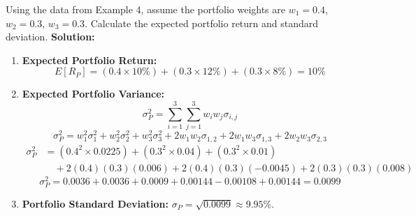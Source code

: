 \begin{tcolorbox}[
	colback=gray!5!white,
	colframe=black!15!white,
	boxrule=0.5pt,
	arc=3pt,
	title=\textbf{Example 5: Return and Risk of a Three-Asset Portfolio},
	coltitle=black,
	colbacktitle=black!5!white,
	before skip=6pt,
	after skip=6pt,
	breakable
]
Using the data from Example 4, assume the portfolio weights are $w_1 = 0.4$, $w_2 = 0.3$, $w_3 = 0.3$.
Calculate the expected portfolio return and standard deviation.
\textbf{Solution:}
\begin{enumerate}
	\item \textbf{Expected Portfolio Return:}
	      \[
	      E[R_P] = (0.4 \times 10\%) + (0.3 \times 12\%) + (0.3 \times 8\%) = 10\%
	      \]
	\item \textbf{Expected Portfolio Variance:}
	      \[
	      \sigma_P^2 = \sum_{i=1}^3 \sum_{j=1}^3 w_i w_j \sigma_{i,j}
	      \]
	      \[
	      \sigma_P^2 = w_1^2 \sigma_1^2 + w_2^2 \sigma_2^2 + w_3^2 \sigma_3^2 + 2 w_1 w_2 \sigma_{1,2} + 2 w_1 w_3 \sigma_{1,3} + 2 w_2 w_3 \sigma_{2,3}
	      \]
	      \[
	      \begin{aligned}
		      \sigma_P^2 &= (0.4^2 \times 0.0225) + (0.3^2 \times 0.04) + (0.3^2 \times 0.01) \\
		      &\quad + 2(0.4)(0.3)(0.006) + 2(0.4)(0.3)(-0.0045) + 2(0.3)(0.3)(0.008)
	      \end{aligned}
	      \]
	      \[
	      \sigma_P^2 = 0.0036 + 0.0036 + 0.0009 + 0.00144 - 0.00108 + 0.00144 = 0.0099
	      \]
	\item \textbf{Portfolio Standard Deviation:} $\sigma_P = \sqrt{0.0099} \approx 9.95\%$.
\end{enumerate}
\end{tcolorbox}

